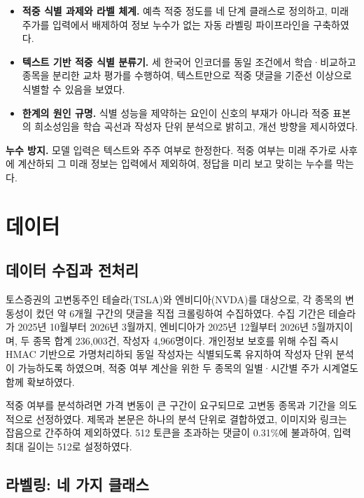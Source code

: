 \documentclass[11pt]{article}
\begin{document}
\begin{itemize}
\item \textbf{적중 식별 과제와 라벨 체계.} 예측 적중 정도를 네 단계 클래스로 정의하고, 미래 주가를 입력에서 배제하여 정보 누수가 없는 자동 라벨링 파이프라인을 구축하였다.
\item \textbf{텍스트 기반 적중 식별 분류기.} 세 한국어 인코더를 동일 조건에서 학습·비교하고 종목을 분리한 교차 평가를 수행하여, 텍스트만으로 적중 댓글을 기준선 이상으로 식별할 수 있음을 보였다.
\item \textbf{한계의 원인 규명.} 식별 성능을 제약하는 요인이 신호의 부재가 아니라 적중 표본의 희소성임을 학습 곡선과 작성자 단위 분석으로 밝히고, 개선 방향을 제시하였다.
\end{itemize}

\textbf{누수 방지.} 모델 입력은 텍스트와 주주 여부로 한정한다. 적중 여부는 미래 주가로 사후에 계산하되 그 미래 정보는 입력에서 제외하여, 정답을 미리 보고 맞히는 누수를 막는다.

\section{데이터}

\subsection{데이터 수집과 전처리}

토스증권의 고변동주인 테슬라(TSLA)와 엔비디아(NVDA)를 대상으로, 각 종목의 변동성이 컸던 약 6개월 구간의 댓글을 직접 크롤링하여 수집하였다. 수집 기간은 테슬라가 2025년 10월부터 2026년 3월까지, 엔비디아가 2025년 12월부터 2026년 5월까지이며, 두 종목 합계 236,003건, 작성자 4,966명이다. 개인정보 보호를 위해 수집 즉시 HMAC 기반으로 가명처리하되 동일 작성자는 식별되도록 유지하여 작성자 단위 분석이 가능하도록 하였으며, 적중 여부 계산을 위한 두 종목의 일별·시간별 주가 시계열도 함께 확보하였다.

적중 여부를 분석하려면 가격 변동이 큰 구간이 요구되므로 고변동 종목과 기간을 의도적으로 선정하였다. 제목과 본문은 하나의 분석 단위로 결합하였고, 이미지와 링크는 잡음으로 간주하여 제외하였다. 512 토큰을 초과하는 댓글이 0.31\%에 불과하여, 입력 최대 길이는 512로 설정하였다.

\subsection{라벨링: 네 가지 클래스}
\end{document}
